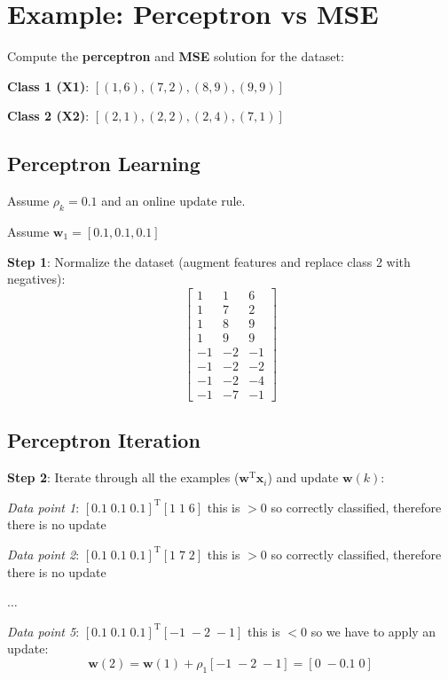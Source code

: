 \documentclass[11pt,a4paper]{article}
\theoremstyle{definition}
\theoremstyle{plain}
\theoremstyle{remark}
\begin{document}
\section{Example: Perceptron vs MSE}

Compute the \textbf{perceptron} and \textbf{MSE} solution for the dataset:

\textbf{Class 1 (X1)}: $[(1,6), (7,2), (8,9), (9,9)]$

\textbf{Class 2 (X2)}: $[(2,1), (2,2), (2,4), (7,1)]$

\subsection{Perceptron Learning}

Assume $\rho_k = 0.1$ and an online update rule.

Assume $\mathbf{w}_1 = [0.1, 0.1, 0.1]$

\textbf{Step 1}: Normalize the dataset (augment features and replace class 2 with negatives):
\[
\begin{bmatrix}
1 & 1 & 6 \\
1 & 7 & 2 \\
1 & 8 & 9 \\
1 & 9 & 9 \\
-1 & -2 & -1 \\
-1 & -2 & -2 \\
-1 & -2 & -4 \\
-1 & -7 & -1
\end{bmatrix}
\]

\subsection{Perceptron Iteration}

\textbf{Step 2}: Iterate through all the examples ($\mathbf{w}^{\mathrm{T}}\mathbf{x}_i$) and update $\mathbf{w}(k)$:

\textit{Data point 1}: $[0.1 \; 0.1 \; 0.1]^{\mathrm{T}} [1 \; 1 \; 6]$ this is $>0$ so correctly classified, therefore there is no update

\textit{Data point 2}: $[0.1 \; 0.1 \; 0.1]^{\mathrm{T}} [1 \; 7 \; 2]$ this is $>0$ so correctly classified, therefore there is no update

$\ldots$

\textit{Data point 5}: $[0.1 \; 0.1 \; 0.1]^{\mathrm{T}} [-1 \; -2 \; -1]$ this is $<0$ so we have to apply an update:
\[
\mathbf{w}(2) = \mathbf{w}(1) + \rho_1 [-1 \; -2 \; -1] = [0 \; -0.1 \; 0]
\]
\end{document}
